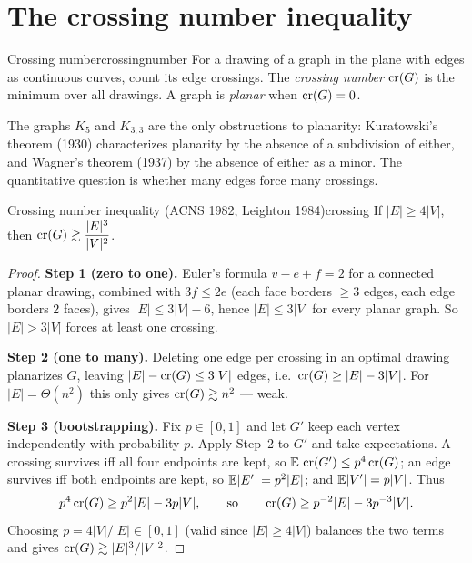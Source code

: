 \section{The crossing number inequality}

\begin{definition}{Crossing number}{crossingnumber}
For a drawing of a graph in the plane with edges as continuous curves, count
its edge crossings. The \emph{crossing number} $\operatorname{cr}(G)$ is the minimum over
all drawings. A graph is \emph{planar} when $\operatorname{cr}(G)=0$.
\end{definition}

The graphs $K_5$ and $K_{3,3}$ are the only obstructions to planarity:
Kuratowski's theorem (1930) characterizes planarity by the absence of a
subdivision of either, and Wagner's theorem (1937) by the absence of either as
a minor. The quantitative question is whether many edges force many crossings.

\begin{theorem}{Crossing number inequality (ACNS 1982, Leighton 1984)}{crossing}
If $|E|\ge 4|V|$, then $\displaystyle \operatorname{cr}(G)\gtrsim\frac{|E|^3}{|V|^2}$.
\end{theorem}

\begin{proof}
\textbf{Step 1 (zero to one).} Euler's formula $v-e+f=2$ for a connected
planar drawing, combined with $3f\le 2e$ (each face borders $\ge3$ edges, each
edge borders $2$ faces), gives $|E|\le 3|V|-6$, hence $|E|\le 3|V|$ for every
planar graph. So $|E|>3|V|$ forces at least one crossing.

\smallskip\noindent\textbf{Step 2 (one to many).} Deleting one edge per
crossing in an optimal drawing planarizes $G$, leaving
$|E|-\operatorname{cr}(G)\le 3|V|$ edges, i.e.\ $\operatorname{cr}(G)\ge|E|-3|V|$. For
$|E|=\Theta(n^2)$ this only gives $\operatorname{cr}(G)\gtrsim n^2$ --- weak.

\smallskip\noindent\textbf{Step 3 (bootstrapping).} Fix $p\in[0,1]$ and let
$G'$ keep each vertex independently with probability $p$. Apply Step~2 to
$G'$ and take expectations. A crossing survives iff all four endpoints are
kept, so $\mathbb{E}\,\operatorname{cr}(G')\le p^4\operatorname{cr}(G)$; an edge survives iff both endpoints
are kept, so $\mathbb{E}|E'|=p^2|E|$; and $\mathbb{E}|V'|=p|V|$. Thus
\[
  p^4\operatorname{cr}(G)\ge p^2|E|-3p|V|,\qquad\text{so}\qquad
  \operatorname{cr}(G)\ge p^{-2}|E|-3p^{-3}|V|.
\]
Choosing $p=4|V|/|E|\in[0,1]$ (valid since $|E|\ge4|V|$) balances the two
terms and gives $\operatorname{cr}(G)\gtrsim|E|^3/|V|^2$.
\end{proof}

